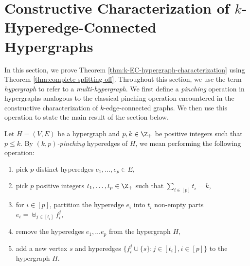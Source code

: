 \section{Constructive Characterization of \(k\)-Hyperedge-Connected Hypergraphs}
\label{sec:characterizing-k-edge-connected-hypergraphs}
In this section, we prove Theorem \ref{thm:k-EC-hypergraph-characterization} using Theorem \ref{thm:complete-splitting-off}. 
Throughout this section, we use the term \emph{hypergraph} to refer to a \emph{multi-hypergraph}.
\iffalse
We first define a \emph{pinching} operation in hypergraphs analogous to the classical pinching operation encountered in the constructive characterization of $k$-edge-connected graphs. We then use this operation to state the main result of the section below.
\begin{definition}
    Let $H = (V, E)$ be a hypergraph and $p,k \in \Z_+$ be positive integers such that $p \leq k$. By \emph{$(k, p)$-pinching} hyperedges of $H$, we mean performing the following operation:
    \begin{enumerate}
        \item pick $p$ distinct hyperedges $e_1, \ldots, e_p \in E$,
        \item pick $p$ positive integers $t_1, \ldots, t_p \in \Z_+$ such that $\sum_{i \in [p]} t_i = k$,
        \item for $i \in [p]$, partition the hyperedge $e_i$ into $t_i$ non-empty parts $e_i = \uplus_{j \in [t_i]} f_i^j$,
        \item remove the hyperedges $e_1, \ldots e_p$ from the hypergraph $H$,
        \item add a new vertex $s$ and hyperedges $\{f_i^j \cup \{s\} : j \in [t_i], i \in [p]\}$ to the hypergraph $H$.
    \end{enumerate}
\end{definition}

